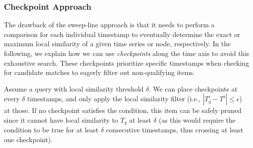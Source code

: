 \subsubsection{Checkpoint Approach}
\label{sec:checkpoint}


The drawback of the sweep-line approach is that it needs to perform a comparison for each individual timestamp to eventually determine the exact or maximum local similarity of a given time series or node, respectively. In the following, we explain how we can use \textit{checkpoints} along the time axis to avoid this exhaustive search. These checkpoints prioritize specific timestamps when checking for candidate matches to eagerly filter out non-qualifying items.


Assume a query with local similarity threshold $\delta$. We can place checkpoints at every $\delta$ timestamps, and only apply the local similarity filter (i.e., $|T_q^{i} - T^{i}| \leq \epsilon$) at those. If no checkpoint satisfies the condition, this item can be safely pruned since it cannot have local similarity to $T_q$ at least $\delta$ (as this would require the condition to be true for at least $\delta$ consecutive timestamps, thus crossing at least one checkpoint).

